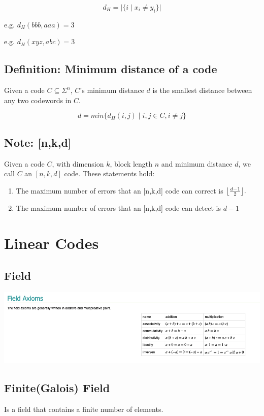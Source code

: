 \documentclass[12pt]{article}
\DeclarePairedDelimiter\floor{\lfloor}{\rfloor}
\begin{document}
$$d_H = \lvert \{ i \mid x_i \neq y_i \} \rvert$$

e.g. $d_H(bbb, aaa) = 3$

e.g. $d_H(xyz, abc) = 3$

\subsection{Definition: Minimum distance of a code}
Given a code $C \subseteq \Sigma^n$, $C$'s minimum distance $d$ is the smallest distance between any two codewords in $C$.

$$d = min \{d_H(i,j) \mid i,j \in C, i \neq j \}$$

\subsection{Note: [n,k,d]}
Given a code $C$, with dimension $k$, block length $n$ and minimum distance $d$, we call $C$ an $[n,k,d]$ code. These statements hold:

\begin{enumerate}
  \item The maximum number of errors that an [n,k,d] code can correct is $\floor*{\frac{d-1}{2}}.$

  \item The maximum number of errors that an [n,k,d] code can detect is $d-1$
\end{enumerate}
\break

\section{Linear Codes}

\subsection{Field}
\includegraphics[scale=0.5]{field.png}

\subsection{Finite(Galois) Field}
Is a field that contains a finite number of elements. 
\end{document}

